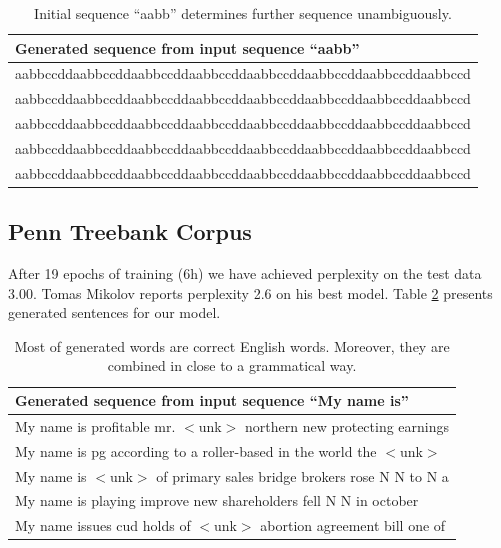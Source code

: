 \documentclass{article}
\begin{document}
\begin{table}[t]
\tiny
\centering
\begin{tabular}{l}
\hline
Generated sequence from input sequence ``aabb'' \\
\hline
 aabbccddaabbccddaabbccddaabbccddaabbccddaabbccddaabbccddaabbccd\\
 aabbccddaabbccddaabbccddaabbccddaabbccddaabbccddaabbccddaabbccd\\
 aabbccddaabbccddaabbccddaabbccddaabbccddaabbccddaabbccddaabbccd\\
 aabbccddaabbccddaabbccddaabbccddaabbccddaabbccddaabbccddaabbccd\\
 aabbccddaabbccddaabbccddaabbccddaabbccddaabbccddaabbccddaabbccd\\
\hline
\end{tabular}
\caption{Initial sequence ``aabb'' determines further sequence unambiguously.}
        \label{tab:aabb}
\end{table}



\subsection{Penn Treebank Corpus}
After 19 epochs of training (6h) we have achieved perplexity on the test data 3.00. 
Tomas Mikolov reports perplexity 2.6 on his best model.
Table \ref{tab:penn} presents generated sentences for our model.


\begin{table}[t]
\tiny
\centering
\begin{tabular}{l}
\hline
Generated sequence from input sequence ``My name is'' \\
\hline
 My name is profitable mr. $<$unk$>$ northern new protecting earnings\\ 
 My name is pg according to a roller-based in the world the $<$unk$>$\\
 My name is $<$unk$>$ of primary sales bridge brokers rose N N to N a\\
 My name is playing improve new shareholders fell N N in october \\
 My name issues cud holds of $<$unk$>$ abortion agreement bill one of\\
\hline
\end{tabular}
\caption{Most of generated words are correct English words. Moreover, they
are combined in close to a grammatical way.}
        \label{tab:penn}
\end{table}
\end{document}
